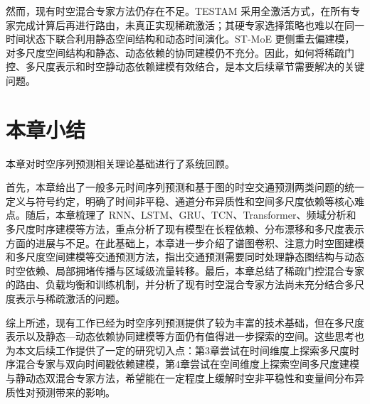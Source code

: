然而，现有时空混合专家方法仍存在不足。TESTAM 采用全激活方式，在所有专家完成计算后再进行路由，未真正实现稀疏激活；其硬专家选择策略也难以在同一时间状态下联合利用静态空间结构和动态时间演化。ST-MoE 更侧重去偏建模，对多尺度空间结构和静态、动态依赖的协同建模仍不充分。因此，如何将稀疏门控、多尺度表示和时空静动态依赖建模有效结合，是本文后续章节需要解决的关键问题。

\section{本章小结}

本章对时空序列预测相关理论基础进行了系统回顾。

首先，本章给出了一般多元时间序列预测和基于图的时空交通预测两类问题的统一定义与符号约定，明确了时间非平稳、通道分布异质性和空间多尺度依赖等核心难点。随后，本章梳理了 RNN、LSTM、GRU、TCN、Transformer、频域分析和多尺度时序建模等方法，重点分析了现有模型在长程依赖、分布漂移和多尺度表示方面的进展与不足。在此基础上，本章进一步介绍了谱图卷积、注意力时空图建模和多尺度空间建模等交通预测方法，指出交通预测需要同时处理静态图结构与动态时空依赖、局部拥堵传播与区域级流量转移。最后，本章总结了稀疏门控混合专家的路由、负载均衡和训练机制，并分析了现有时空混合专家方法尚未充分结合多尺度表示与稀疏激活的问题。

综上所述，现有工作已经为时空序列预测提供了较为丰富的技术基础，但在多尺度表示以及静态—动态依赖协同建模等方面仍有值得进一步探索的空间。这些思考也为本文后续工作提供了一定的研究切入点：第3章尝试在时间维度上探索多尺度时序混合专家与双向时间戳依赖建模，第4章尝试在空间维度上探索空间多尺度建模与静动态双混合专家方法，希望能在一定程度上缓解时空非平稳性和变量间分布异质性对预测带来的影响。
